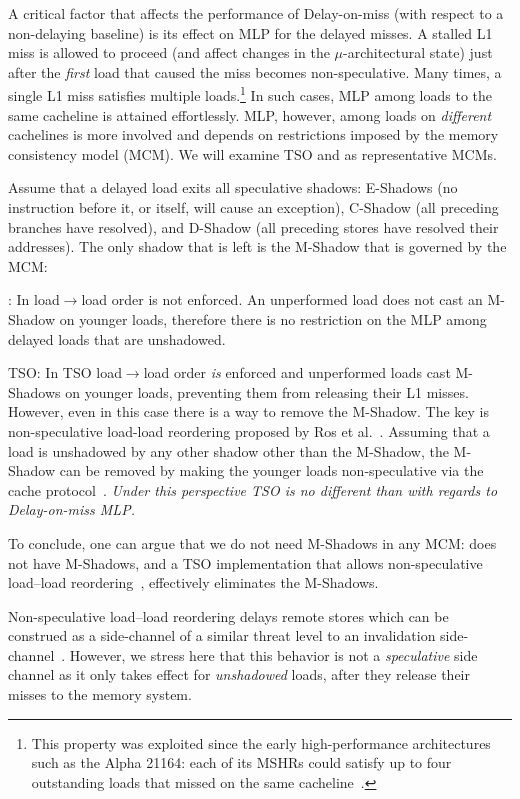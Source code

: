 A critical factor that affects the performance of Delay-on-miss (with respect to a non-delaying baseline) is its effect on MLP for the delayed misses. 
A stalled L1 miss is allowed to proceed (and affect changes in the $\mu$-architectural state) just after the \emph{first} load that caused the miss becomes non-speculative.
Many times, a single L1 miss satisfies multiple loads.\footnote{This property was exploited since the early high-performance architectures such as the Alpha 21164: each of its MSHRs could satisfy up to four outstanding loads that missed on the same cacheline~\cite{alpha21164}.} 
In such cases, MLP among loads to the same cacheline is attained effortlessly.
MLP, however, among loads on \emph{different} cachelines is more involved and depends on restrictions imposed by the memory consistency model (MCM). We will examine TSO and {\rc} as representative MCMs.

Assume that a delayed load exits all speculative shadows: E-Shadows (no instruction before it, or itself, will cause an exception), C-Shadow (all preceding branches have resolved), and D-Shadow (all preceding stores have resolved their addresses). The only shadow that is left is the M-Shadow that is governed by the MCM:
\squishlist
\item {\rc}: In {\rc} load$\rightarrow$load order is not enforced. An unperformed load does not cast an M-Shadow on younger loads, therefore there is no restriction on the MLP among delayed loads that are unshadowed.
\item TSO: In TSO load$\rightarrow$load order \emph{is} enforced and unperformed loads cast M-Shadows on younger loads, preventing them from releasing their L1 misses. However, even in this case there is a way to remove the M-Shadow. The key is non-speculative load-load reordering proposed by Ros et al.~\cite{aros-isca17}. Assuming that a load is unshadowed by any other shadow other than the M-Shadow, the M-Shadow can be removed by making the younger loads non-speculative via the cache protocol~\cite{aros-isca17}. \emph{Under this perspective TSO is no different than {\rc} with regards to Delay-on-miss MLP.}
\squishend

To conclude, one can argue that we do not need M-Shadows in any MCM: {\rc} does not have M-Shadows, and a TSO implementation that allows non-speculative load--load reordering~\cite{aros-isca17}, effectively eliminates the M-Shadows. 

Non-speculative load--load reordering delays remote stores which can be construed as a side-channel of a similar threat level to an invalidation side-channel~\cite{}. However, we stress here that this behavior is not a \emph{speculative} side channel as it only takes effect for \emph{unshadowed} loads, after they release their misses to the memory system.

